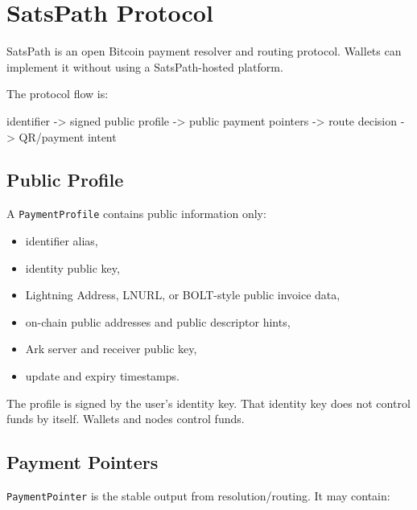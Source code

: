 \documentclass[
]{article}
\author{}
\date{}
\newenvironment{Shaded}{}{}
\newcommand{\NormalTok}[1]{#1}
\providecommand{\tightlist}{%
  \setlength{\itemsep}{0pt}\setlength{\parskip}{0pt}}
\begin{document}
\hypertarget{satspath-protocol}{%
\section{SatsPath Protocol}\label{satspath-protocol}}

SatsPath is an open Bitcoin payment resolver and routing protocol.
Wallets can implement it without using a SatsPath-hosted platform.

The protocol flow is:

\begin{Shaded}
\begin{Highlighting}[]
\NormalTok{identifier {-}\textgreater{} signed public profile {-}\textgreater{} public payment pointers {-}\textgreater{} route decision {-}\textgreater{} QR/payment intent}
\end{Highlighting}
\end{Shaded}

\hypertarget{public-profile}{%
\subsection{Public Profile}\label{public-profile}}

A \texttt{PaymentProfile} contains public information only:

\begin{itemize}
\tightlist
\item
  identifier alias,
\item
  identity public key,
\item
  Lightning Address, LNURL, or BOLT-style public invoice data,
\item
  on-chain public addresses and public descriptor hints,
\item
  Ark server and receiver public key,
\item
  update and expiry timestamps.
\end{itemize}

The profile is signed by the user's identity key. That identity key does
not control funds by itself. Wallets and nodes control funds.

\hypertarget{payment-pointers}{%
\subsection{Payment Pointers}\label{payment-pointers}}

\texttt{PaymentPointer} is the stable output from resolution/routing. It
may contain:
\end{document}

